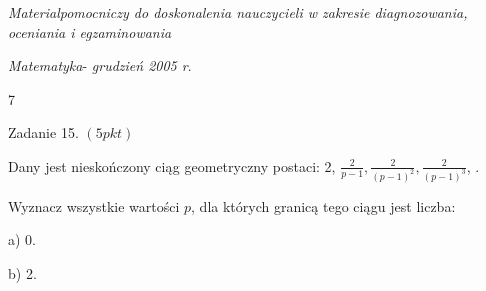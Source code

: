\documentclass[a4paper,12pt]{article}
\begin{document}
{\it Materialpomocniczy do doskonalenia nauczycieli w zakresie diagnozowania, oceniania i egzaminowania}

{\it Matematyka}- {\it grudzień 2005 r}.

7

Zadanie 15. $(5pkt)$

Dany jest nieskończony ciąg geometryczny postaci: 2, $\displaystyle \frac{2}{p-1}, \displaystyle \frac{2}{(p-1)^{2}}, \displaystyle \frac{2}{(p-1)^{3}}$, .

Wyznacz wszystkie wartości $p$, dla których granicą tego ciągu jest liczba:

a) 0.

b) 2.
\end{document}
